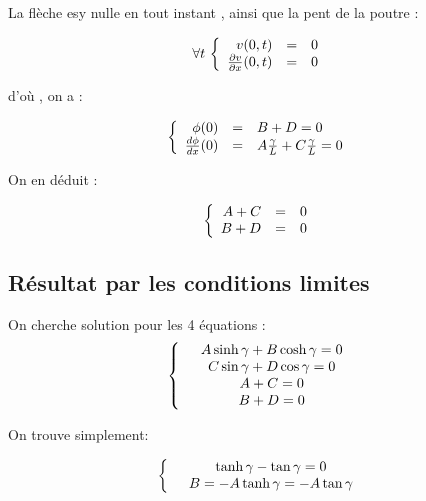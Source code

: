 \documentclass[a4paper,10pt]{report} %
\begin{document}
La flèche esy nulle en tout instant , ainsi que la pent de la poutre : 

\begin{equation}
    \forall t\,
    \left \{
    \begin{array}{r c l}v(0,t)&=&0\\\frac{\partial v}{\partial x}(0,t)&=&0
    \end{array}
    \right.
\end{equation}

d'où , on a :

\begin{equation}
    \left\{
    \begin{array}{r c l}
    \phi (0)&=&B+D=0\\\frac{d\phi}{dx}(0)&=&A\frac{\gamma}{L}+C\frac{\gamma}{L}=0
    \end{array}
    \right.
\end{equation}

On en déduit :

\begin{equation}
    \left\{
    \begin{array}{r c l}
    A+C&=&0\\
    B+D&=&0
    \end{array}
    \right.
\end{equation}


\subsection{Résultat par les conditions limites}

On cherche solution pour les 4 équations :
\begin{equation}
    \left\{
    \begin{array}{r c l}
    &A\sinh{\gamma}+B\cosh{\gamma}=0\\
    &C\sin{\gamma}+D\cos{\gamma}=0\\
    &A+C=0\\
    &B+D=0
    \end{array}
    \right.
\end{equation}

On trouve simplement:


\begin{equation}
    \left\{
    \begin{array}{r c l}
    &\tanh{\gamma}-\tan{\gamma}=0\\
    &B=-A\tanh{\gamma}=-A\tan{\gamma}
    \end{array}
    \right.
\end{equation}
\end{document}
